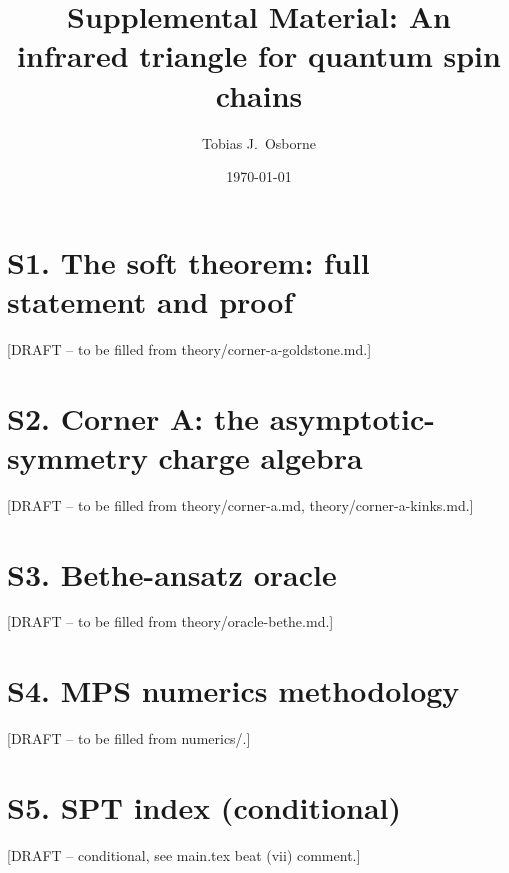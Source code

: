 \documentclass[aps,prl,superscriptaddress,longbibliography]{revtex4-2}
\begin{document}
\title{Supplemental Material: An infrared triangle for quantum spin chains}

\author{Tobias J.~Osborne}

\date{\today}

\maketitle

\section{S1. The soft theorem: full statement and proof}
[DRAFT -- to be filled from theory/corner-a-goldstone.md.]

\section{S2. Corner A: the asymptotic-symmetry charge algebra}
[DRAFT -- to be filled from theory/corner-a.md, theory/corner-a-kinks.md.]

\section{S3. Bethe-ansatz oracle}
[DRAFT -- to be filled from theory/oracle-bethe.md.]

\section{S4. MPS numerics methodology}
[DRAFT -- to be filled from numerics/.]

\section{S5. SPT index (conditional)}
[DRAFT -- conditional, see main.tex beat (vii) comment.]


\end{document}
